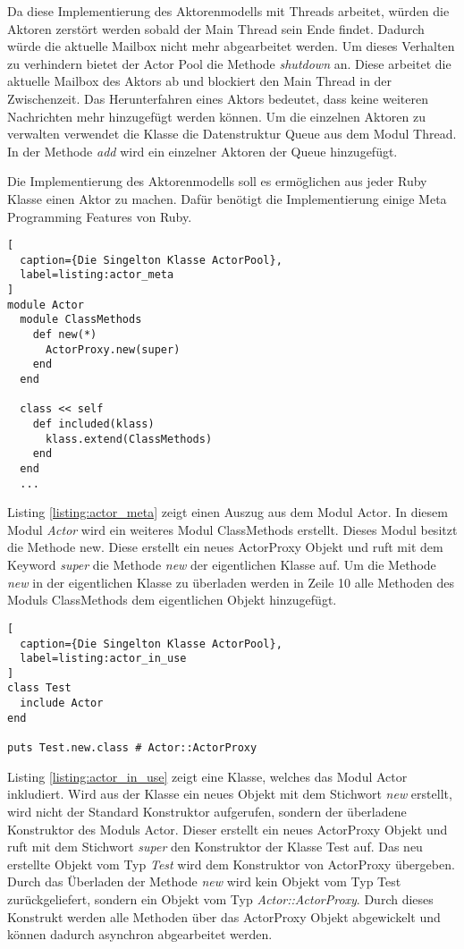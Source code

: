 Da diese Implementierung des Aktorenmodells mit Threads arbeitet, würden die Aktoren zerstört werden sobald der Main Thread sein Ende findet. Dadurch würde die aktuelle Mailbox nicht mehr abgearbeitet werden. Um dieses Verhalten zu verhindern bietet der Actor Pool die Methode \emph{shutdown} an. Diese arbeitet die aktuelle Mailbox des Aktors ab und blockiert den Main Thread in der Zwischenzeit. Das Herunterfahren eines Aktors bedeutet, dass keine weiteren Nachrichten mehr hinzugefügt werden können. Um die einzelnen Aktoren zu verwalten verwendet die Klasse die Datenstruktur Queue aus dem Modul Thread. In der Methode \emph{add} wird ein einzelner Aktoren der Queue hinzugefügt. 

Die Implementierung des Aktorenmodells soll es ermöglichen aus jeder Ruby Klasse einen Aktor zu machen. Dafür benötigt die Implementierung einige Meta Programming Features von Ruby. 

\begin{lstlisting}[
  caption={Die Singelton Klasse ActorPool},
  label=listing:actor_meta
]
module Actor
  module ClassMethods
    def new(*)
      ActorProxy.new(super)
    end
  end

  class << self
    def included(klass)
      klass.extend(ClassMethods)
    end
  end
  ...
\end{lstlisting}


Listing \ref{listing:actor_meta} zeigt einen Auszug aus dem Modul Actor. In diesem Modul \emph{Actor} wird ein weiteres Modul ClassMethods erstellt. Dieses Modul besitzt die Methode new. Diese erstellt ein neues ActorProxy Objekt und ruft mit dem Keyword \emph{super} die Methode \emph{new} der eigentlichen Klasse auf. Um die Methode \emph{new} in der eigentlichen Klasse zu überladen werden in Zeile 10 alle Methoden des Moduls ClassMethods dem eigentlichen Objekt hinzugefügt. 

\begin{lstlisting}[
  caption={Die Singelton Klasse ActorPool},
  label=listing:actor_in_use
]
class Test
  include Actor
end

puts Test.new.class # Actor::ActorProxy
\end{lstlisting}

Listing \ref{listing:actor_in_use} zeigt eine Klasse, welches das Modul Actor inkludiert.  Wird aus der Klasse ein neues Objekt mit dem Stichwort \emph{new} erstellt, wird nicht der Standard Konstruktor aufgerufen, sondern der überladene Konstruktor des Moduls Actor. Dieser erstellt ein neues ActorProxy Objekt und ruft mit dem Stichwort \emph{super} den Konstruktor der Klasse Test auf. Das neu erstellte Objekt vom Typ \emph{Test} wird dem Konstruktor von ActorProxy übergeben. Durch das Überladen der Methode \emph{new} wird kein Objekt vom Typ Test zurückgeliefert, sondern ein Objekt vom Typ \emph{Actor::ActorProxy}. Durch dieses Konstrukt 
werden alle Methoden über das ActorProxy Objekt abgewickelt und können dadurch asynchron abgearbeitet werden.

